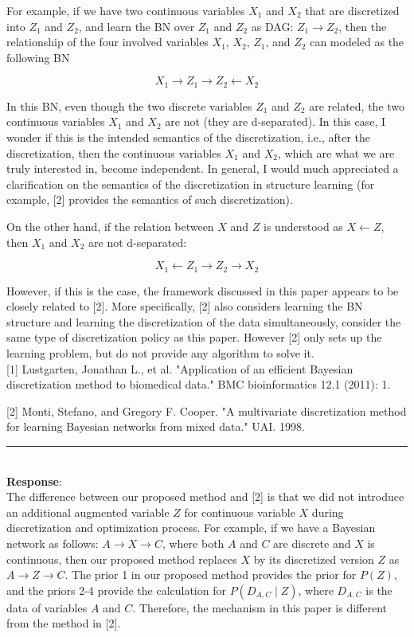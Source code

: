\documentclass{article}
\begin{document}
For example, if we have two continuous variables $X_1$ and $X_2$ that are discretized into $Z_1$ and $Z_2$, and learn the BN over $Z_1$ and $Z_2$ as DAG: $Z_1 \rightarrow Z_2$, then the relationship of the four involved variables $X_1$, $X_2$, $Z_1$, and $Z_2$ can modeled as the following BN


$$X_1 \rightarrow Z_1 \rightarrow Z_2 \leftarrow X_2$$


In this BN, even though the two discrete variables $Z_1$ and $Z_2$ are related, the two continuous variables $X_1$ and $X_2$ are not (they are d-separated). In this case, I wonder if this is the intended semantics of the discretization, i.e., after the discretization, then the continuous variables $X_1$ and $X_2$, which are what we are truly interested in, become independent. In general, I would much appreciated a clarification on the semantics of the discretization in structure learning (for example, [2] provides the semantics of such discretization).

On the other hand, if the relation between $X$ and $Z$ is understood as $X \leftarrow Z$, then $X_1$ and $X_2$ are not d-separated:

$$X_1 \leftarrow Z_1 \rightarrow Z_2 \rightarrow X_2$$

However, if this is the case, the framework discussed in this paper appears to be closely related to [2]. More specifically, [2] also considers learning the BN structure and learning the discretization of the data simultaneously, consider the same type of discretization policy as this paper. However [2] only sets up the learning problem, but do not provide any algorithm to solve it.\\

[1] Lustgarten, Jonathan L., et al. "Application of an efficient Bayesian discretization method to biomedical data." BMC bioinformatics 12.1 (2011): 1.

[2] Monti, Stefano, and Gregory F. Cooper. "A multivariate discretization method for learning Bayesian networks from mixed data." UAI. 1998.

\noindent\rule{8cm}{0.4pt}\\
{\bf Response}:\\

The difference between our proposed method and [2] is that we did not introduce an additional augmented variable $Z$ for continuous variable $X$ during discretization and optimization process.
For example, if we have a Bayesian network as follows: $A \rightarrow X \rightarrow C$, where both $A$ and $C$ are discrete and $X$ is continuous, then our proposed method replaces $X$ by its discretized version $Z$ as $A \rightarrow Z \rightarrow C$.
The prior 1 in our proposed method provides the prior for $P(Z)$, and the priors 2-4 provide the calculation for $P(D_{A,C} \mid Z)$, where $D_{A,C}$ is the data of variables $A$ and $C$.
Therefore, the mechanism in this paper is different from the method in [2].
\end{document}
